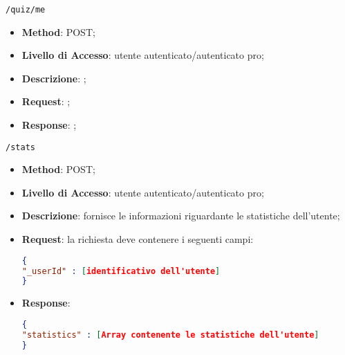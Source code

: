 	\item \texttt{/quiz/me}
		\begin{itemize}
			\item \textbf{Method}: POST;
			\item \textbf{Livello di Accesso}: utente autenticato/autenticato pro;
			\item  \textbf{Descrizione}: ; 
			\item \textbf{Request}: ;
			\item \textbf{Response}: ;
		\end{itemize}
	\item \texttt{/stats}
		\begin{itemize}
			\item \textbf{Method}: POST;
			\item \textbf{Livello di Accesso}: utente autenticato/autenticato pro;
			\item \textbf{Descrizione}: fornisce le informazioni riguardante le statistiche dell'utente;
			\item \textbf{Request}: la richiesta deve contenere i seguenti campi:
\begin{lstlisting}[language=json,firstnumber=1]
{
"_userId" : [identificativo dell'utente]
}
\end{lstlisting}
			\item \textbf{Response}: 
\begin{lstlisting}[language=json,firstnumber=1]
{
"statistics" : [Array contenente le statistiche dell'utente]
}
\end{lstlisting}
		\end{itemize}